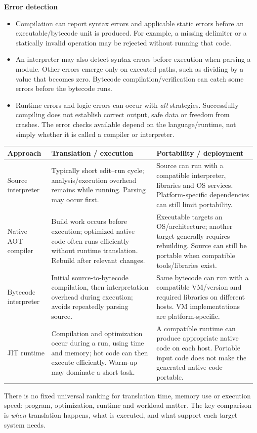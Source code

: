 \documentclass[a4paper,12pt]{article}
\begin{document}
\textbf{Error detection}
\begin{itemize}
    \item Compilation can report syntax errors and applicable static errors before an executable/bytecode unit is produced. For example, a missing delimiter or a statically invalid operation may be rejected without running that code.
    \item An interpreter may also detect syntax errors before execution when parsing a module. Other errors emerge only on executed paths, such as dividing by a value that becomes zero. Bytecode compilation/verification can catch some errors before the bytecode runs.
    \item Runtime errors and logic errors can occur with \emph{all} strategies. Successfully compiling does not establish correct output, safe data or freedom from crashes. The error checks available depend on the language/runtime, not simply whether it is called a compiler or interpreter.
\end{itemize}
\begin{center}
\begin{tabularx}{0.98\linewidth}{p{2.5cm} X X}
\toprule
\textbf{Approach} & \textbf{Translation / execution} & \textbf{Portability / deployment} \\
\midrule
Source interpreter & Typically short edit--run cycle; analysis/execution overhead remains while running. Parsing may occur first. & Source can run with a compatible interpreter, libraries and OS services. Platform-specific dependencies can still limit portability. \\
Native AOT compiler & Build work occurs before execution; optimized native code often runs efficiently without runtime translation. Rebuild after relevant changes. & Executable targets an OS/architecture; another target generally requires rebuilding. Source can still be portable when compatible tools/libraries exist. \\
Bytecode interpreter & Initial source-to-bytecode compilation, then interpretation overhead during execution; avoids repeatedly parsing source. & Same bytecode can run with a compatible VM/version and required libraries on different hosts. VM implementations are platform-specific. \\
JIT runtime & Compilation and optimization occur during a run, using time and memory; hot code can then execute efficiently. Warm-up may dominate a short task. & A compatible runtime can produce appropriate native code on each host. Portable input code does not make the generated native code portable. \\
\bottomrule
\end{tabularx}
\end{center}
There is no fixed universal ranking for translation time, memory use or execution speed: program, optimization, runtime and workload matter. The key comparison is \emph{when} translation happens, what is executed, and what support each target system needs.
\end{document}
